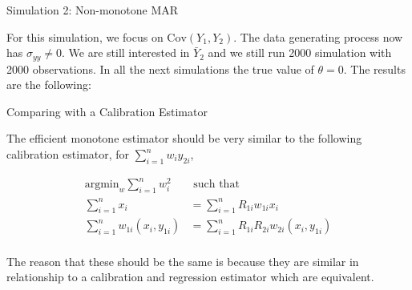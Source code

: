 \documentclass{beamer} %
\newcommand{\argmin}{{\text{argmin}}}
\newcommand{\Cov}{{\text{Cov}}}
\begin{document}
\begin{frame}

  

\end{frame}

\begin{frame}{Simulation 2: Non-monotone MAR}

    For this simulation, we
    focus on $\Cov(Y_1, Y_2)$. The data generating process now has $\sigma_{yy}
    \neq 0$. We are still interested in $\bar Y_2$ and we still run 2000
    simulation with 2000 observations. In all the next simulations the true
    value of $\theta = 0$. The results are the following:

\end{frame}

\begin{frame}

    

\end{frame}

\begin{frame}

    

\end{frame}

\begin{frame}

    

\end{frame}

\begin{frame}{Comparing with a Calibration Estimator}

  The efficient monotone estimator should be very similar to the
    following calibration estimator, for $\sum_{i = 1}^n w_i y_{2i}$,

    \begin{align*}
      \argmin_w \sum_{i = 1}^n w_i^2& \text{ such that }\\
      \sum_{i = 1}^n x_i &= \sum_{i = 1}^n R_{1i} w_{1i} x_i \\
      \sum_{i = 1}^n w_{1i} (x_i, y_{1i}) &= \sum_{i = 1}^n R_{1i} R_{2i} w_{2i}
      (x_i, y_{1i}) \\
    \end{align*}

  The reason that these should be the same is because they are similar in
    relationship to a calibration and regression estimator which are equivalent.
  
\end{frame}
\end{document}
